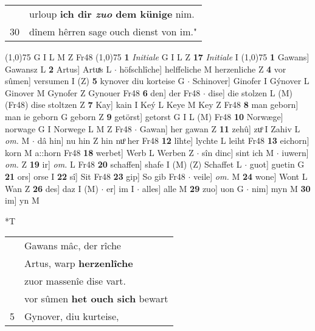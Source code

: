 \documentclass[8pt,a4paper,notitlepage]{article}
\begin{document}
\begin{table}[ht]
\begin{minipage}[t]{0.5\linewidth}
\begin{tabular}{rl}
 & urloup \textbf{ich dir \textit{zuo} dem künige} nim.\\ 
30 & dînem hêrren sage ouch dienst von im."\\ 
\end{tabular}
\scriptsize
\line(1,0){75} \newline
G I L M Z Fr48 \newline
\line(1,0){75} \newline
\textbf{1} \textit{Initiale} G I L Z  \textbf{17} \textit{Initiale} I  \newline
\line(1,0){75} \newline
\textbf{1} Gawans] Gawansz L \textbf{2} Artus] Artuͯs L  $\cdot$ höfschlîche] helffeliche M herzenliche Z \textbf{4} vor sûmen] versumen I (Z) \textbf{5} kynover diu korteise G  $\cdot$ Schinover] Ginofer I Gýnover L Ginover M Gynofer Z Gynouer Fr48 \textbf{6} den] der Fr48  $\cdot$ dise] die stolzen L (M) (Fr48) dise stoltzen Z \textbf{7} Kay] kain I Keý L Keye M Key Z Fr48 \textbf{8} man geborn] man ie geborn G geborn Z \textbf{9} getörst] getorst G I L (M) Fr48 \textbf{10} Norwæge] norwage G I Norwege L M Z Fr48  $\cdot$ Gawan] her gawan Z \textbf{11} zehû] zuͦ I Zahiv L \textit{om.} M  $\cdot$ dâ hin] nu hin Z hin nuͦ her Fr48 \textbf{12} lîhte] lychte L leiht Fr48 \textbf{13} eichorn] korn M a::horn Fr48 \textbf{18} werbet] Werb L Werben Z  $\cdot$ sîn dinc] sint ich M  $\cdot$ iuwern] \textit{om.} Z \textbf{19} ir] \textit{om.} L Fr48 \textbf{20} schaffen] shafe I (M) (Z) Schaffet L  $\cdot$ guot] guetin G \textbf{21} ors] orse I \textbf{22} sî] Sit Fr48 \textbf{23} gip] So gib Fr48  $\cdot$ veile] \textit{om.} M \textbf{24} wone] Wont L Wan Z \textbf{26} des] daz I (M)  $\cdot$ er] im I  $\cdot$ alles] alle M \textbf{29} zuo] uon G  $\cdot$ nim] myn M \textbf{30} im] yn M \newline
\end{minipage}
\hspace{0.5cm}
\begin{minipage}[t]{0.5\linewidth}
\small
\begin{center}*T
\end{center}
\begin{tabular}{rl}
 & Gawans mâc, der rîche\\ 
 & Artus, warp \textbf{herzenlîche}\\ 
 & zuor massenîe dise vart.\\ 
 & vor sûmen \textbf{het ouch sich} bewart\\ 
5 & Gynover, diu kurteise,\\ 

\end{tabular}
\end{minipage}
\end{table}
\end{document}
